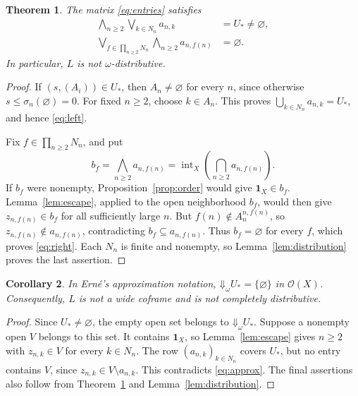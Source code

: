 \documentclass[11pt]{amsart}
\newtheorem{theorem}{Theorem}[section]
\newtheorem{corollary}[theorem]{Corollary}
\theoremstyle{definition}
\theoremstyle{remark}
\numberwithin{equation}{section}
\newcommand{\OO}{\mathcal O}
\newcommand{\DD}{\mathord\Downarrow}
\newcommand{\intr}{\operatorname{int}}
\newcommand{\tops}{\mathbf 1_X}
\begin{document}
\begin{theorem}\label{thm:countable}
The matrix \eqref{eq:entries} satisfies
\begin{align}
\bigwedge_{n\geq2}\bigvee_{k\in N_n}a_{n,k}&=U_*\ne\varnothing,
                                                    \label{eq:left}\\
\bigvee_{f\in\prod_{n\geq2}N_n}\bigwedge_{n\geq2}a_{n,f(n)}
 &=\varnothing.                                    \label{eq:right}
\end{align}
In particular, $L$ is not $\omega$-distributive.
\end{theorem}

\begin{proof}
If $(s,(A_i))\in U_*$, then $A_n\ne\varnothing$ for every $n$,
since otherwise $s\leq\sigma_n(\varnothing)=0$.
For fixed $n\geq2$, choose $k\in A_n$. This proves
$\bigcup_{k\in N_n}a_{n,k}=U_*$, and hence \eqref{eq:left}.

Fix $f\in\prod_{n\geq2}N_n$, and put
\[
b_f=\bigwedge_{n\geq2}a_{n,f(n)}
    =\intr_X\left(\bigcap_{n\geq2}a_{n,f(n)}\right).
\]
If $b_f$ were nonempty, Proposition~\ref{prop:order} would give
$\tops\in b_f$. Lemma~\ref{lem:escape}, applied to the open
neighborhood $b_f$, would then give $z_{n,f(n)}\in b_f$ for all
sufficiently large $n$. But $f(n)\notin A_n^{n,f(n)}$, so
$z_{n,f(n)}\notin a_{n,f(n)}$, contradicting
$b_f\subseteq a_{n,f(n)}$. Thus $b_f=\varnothing$ for every $f$,
which proves \eqref{eq:right}. Each $N_n$ is finite and nonempty,
so Lemma~\ref{lem:distribution} proves the last assertion.
\end{proof}

\begin{corollary}\label{cor:approxzero}
In Ern\'e's approximation notation,
$\DD_\omega U_*=\{\varnothing\}$ in $\OO(X)$.
Consequently, $L$ is not a wide coframe and is not completely
distributive.
\end{corollary}

\begin{proof}
Since $U_*\ne\varnothing$, the empty open set belongs to
$\DD_\omega U_*$. Suppose a nonempty open $V$ belongs to this set.
It contains $\tops$, so Lemma~\ref{lem:escape} gives $n\geq2$
with $z_{n,k}\in V$ for every $k\in N_n$.
The row $(a_{n,k})_{k\in N_n}$ covers $U_*$, but no entry contains
$V$, since $z_{n,k}\in V\setminus a_{n,k}$.
This contradicts \eqref{eq:approx}.
The final assertions also follow from Theorem~\ref{thm:countable}
and Lemma~\ref{lem:distribution}.
\end{proof}
\end{document}
